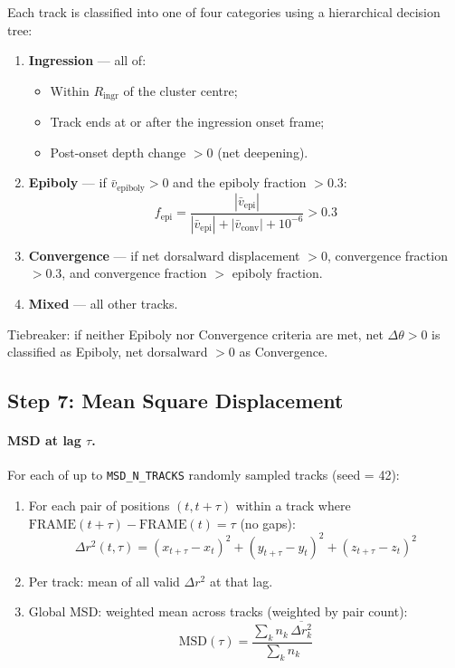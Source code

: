 \documentclass[11pt,a4paper]{article}
\newcommand{\param}[1]{\texttt{#1}}
\begin{document}
Each track is classified into one of four categories using a hierarchical
decision tree:

\begin{enumerate}[nosep]
  \item \textbf{Ingression} --- all of:
    \begin{itemize}[nosep]
      \item Within $R_\mathrm{ingr}$ of the cluster centre;
      \item Track ends at or after the ingression onset frame;
      \item Post-onset depth change $> 0$ (net deepening).
    \end{itemize}
  \item \textbf{Epiboly} --- if $\bar v_\mathrm{epiboly} > 0$ and the
    epiboly fraction $> 0.3$:
    \[
      f_\mathrm{epi} = \frac{|\bar v_\mathrm{epi}|}
        {|\bar v_\mathrm{epi}| + |\bar v_\mathrm{conv}| + 10^{-6}} > 0.3
    \]
  \item \textbf{Convergence} --- if net dorsalward displacement $> 0$,
    convergence fraction $> 0.3$, and convergence fraction $>$ epiboly fraction.
  \item \textbf{Mixed} --- all other tracks.
\end{enumerate}

Tiebreaker: if neither Epiboly nor Convergence criteria are met, net
$\Delta\theta > 0$ is classified as Epiboly, net dorsalward $> 0$ as
Convergence.

\subsection*{Step 7: Mean Square Displacement}
\label{sec:msd}

\paragraph{MSD at lag $\tau$.}
For each of up to \param{MSD\_N\_TRACKS} randomly sampled tracks (seed = 42):
\begin{enumerate}[nosep]
  \item For each pair of positions $(t, t+\tau)$ within a track where
    $\mathrm{FRAME}(t+\tau)-\mathrm{FRAME}(t) = \tau$ (no gaps):
    \[
      \Delta r^2(t,\tau) = (x_{t+\tau}-x_t)^2+(y_{t+\tau}-y_t)^2+(z_{t+\tau}-z_t)^2
    \]
  \item Per track: mean of all valid $\Delta r^2$ at that lag.
  \item Global MSD: weighted mean across tracks (weighted by pair count):
    \[
      \mathrm{MSD}(\tau) = \frac{\sum_k n_k\,\overline{\Delta r^2_k}}
                                {\sum_k n_k}
    \]
\end{enumerate}
\end{document}

